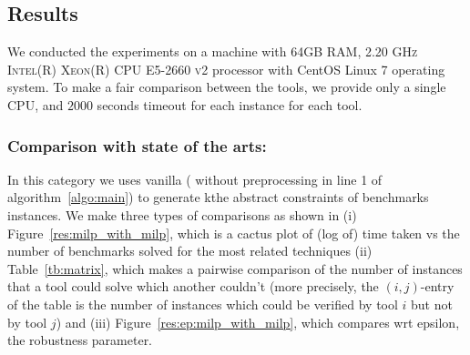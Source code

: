 \begin{table}[t]
\centering
{}
    \caption{Neural networks details}
    \label{tb:nndetail}
\end{table}


\subsection{Results}
We conducted the experiments on a machine with \textsc{64GB RAM, 2.20 GHz Intel(R) Xeon(R) CPU E5-2660 v2}
processor with CentOS Linux 7 operating system. 
To make a fair comparison between the tools, we provide only a single \textsc{CPU}, and $2000$ seconds timeout for each instance for each tool. 

\subsubsection{Comparison with state of the arts:}

In this category we uses vanilla \deeppoly{}(\deeppoly{} without preprocessing in line 1 of algorithm~\ref{algo:main})
to generate kthe abstract constraints of benchmarks instances. 
We make three types of comparisons as shown in (i) Figure~\ref{res:milp_with_milp}, which is a cactus plot of (log of) time taken vs the number of benchmarks solved for the most related techniques (ii) Table~\ref{tb:matrix}, which makes a pairwise comparison of the number of instances that a tool could solve which another couldn't  (more precisely, the $(i,j)$-entry of the table is the number of instances which could be verified by tool $i$ but not by tool $j$) and (iii) Figure~\ref{res:ep:milp_with_milp}, which compares wrt epsilon, the robustness parameter.

